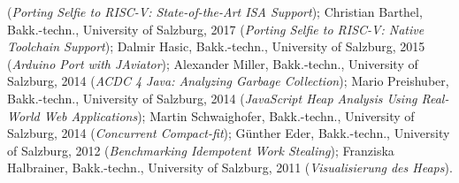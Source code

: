 {\begin{itemize}
(\emph{Porting Selfie to RISC-V: State-of-the-Art ISA Support});
Christian Barthel, Bakk.-techn., University of Salzburg, 2017
(\emph{Porting Selfie to RISC-V: Native Toolchain Support});
Dalmir Hasic, Bakk.-techn., University of Salzburg, 2015
(\emph{Arduino Port with JAviator});
Alexander Miller, Bakk.-techn., University of Salzburg, 2014
(\emph{ACDC 4 Java: Analyzing Garbage Collection});
Mario Preishuber, Bakk.-techn., University of Salzburg, 2014
(\emph{JavaScript Heap Analysis Using Real-World Web Applications});
Martin Schwaighofer, Bakk.-techn., University of Salzburg, 2014
(\emph{Concurrent Compact-fit});
G{\"u}nther Eder, Bakk.-techn., University of Salzburg, 2012
(\emph{Benchmarking Idempotent Work Stealing});
Franziska Halbrainer, Bakk.-techn., University of Salzburg, 2011
(\emph{Visualisierung des Heaps}).
\end{itemize}
}